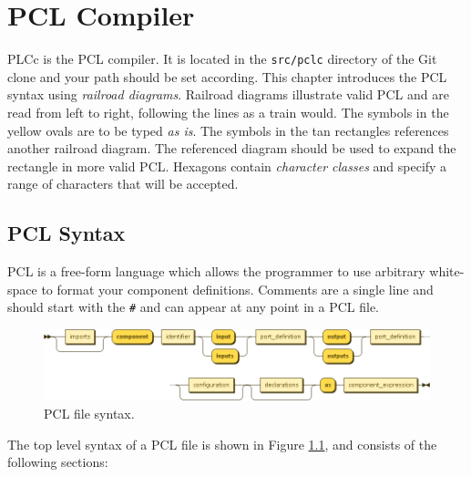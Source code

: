 \chapter{PCL Compiler}
PLCc is the PCL compiler. It is located in the \texttt{src/pclc} directory of the Git clone and your path should be set according. This chapter introduces the PCL syntax using \emph{railroad diagrams}. Railroad diagrams illustrate valid PCL and are read from left to right, following the lines as a train would. The symbols in the yellow ovals are to be typed \emph{as is}. The symbols in the tan rectangles references another railroad diagram. The referenced diagram should be used to expand the rectangle in more valid PCL. Hexagons contain \emph{character classes} and specify a range of characters that will be accepted.

\section{PCL Syntax}
PCL is a free-form language which allows the programmer to use arbitrary white-space to format your component definitions. Comments are a single line and should start with the \texttt{\#} and can appear at any point in a PCL file.
\begin{figure}[h!]
  \centering
    \includegraphics[scale=\DiagramScale,angle=90]{chapters/compiler/diagrams/component}
  \caption{PCL file syntax.}
  \label{fig:pcl-top-level}
\end{figure}
The top level syntax of a PCL file is shown in Figure \ref{fig:pcl-top-level}, and consists of the following sections:
